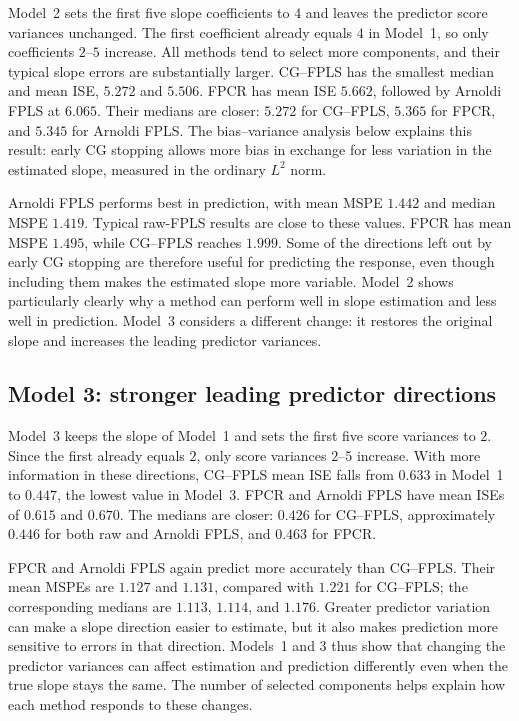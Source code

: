 Model~2 sets the first five slope coefficients to $4$ and leaves the predictor
score variances unchanged. The first coefficient already equals $4$ in
Model~1, so only coefficients $2$--$5$ increase. All methods tend to select
more components, and their typical slope errors are substantially larger. CG--FPLS
has the smallest median and mean ISE, $5.272$ and $5.506$. FPCR has mean
ISE $5.662$, followed by Arnoldi FPLS at $6.065$. Their medians are closer:
$5.272$ for CG--FPLS, $5.365$ for FPCR, and $5.345$ for Arnoldi FPLS. The
bias--variance analysis below explains this result: early CG stopping allows
more bias in exchange for less variation in the estimated slope, measured
in the ordinary $L^2$ norm.

Arnoldi FPLS performs best in prediction, with mean MSPE $1.442$ and median
MSPE $1.419$. Typical raw-FPLS results are close to these values. FPCR has
mean MSPE $1.495$, while CG--FPLS reaches $1.999$. Some of the directions
left out by early CG stopping are therefore useful for predicting the
response, even though including them makes the estimated slope more variable.
Model~2 shows particularly clearly why a method can perform well in slope
estimation and less well in prediction. Model~3 considers a different change:
it restores the original slope and increases the leading predictor variances.

\subsection{Model 3: stronger leading predictor directions}

Model~3 keeps the slope of Model~1 and sets the first five score variances
to $2$. Since the first already equals $2$, only score variances $2$--$5$
increase. With more information in these directions, CG--FPLS mean ISE falls
from $0.633$ in Model~1 to $0.447$, the lowest value in Model~3. FPCR and
Arnoldi FPLS have mean ISEs of $0.615$ and $0.670$. The medians are closer:
$0.426$ for CG--FPLS, approximately $0.446$ for both raw and Arnoldi FPLS,
and $0.463$ for FPCR.

FPCR and Arnoldi FPLS again predict more accurately than CG--FPLS. Their mean
MSPEs are $1.127$ and $1.131$, compared with $1.221$ for CG--FPLS; the
corresponding medians are $1.113$, $1.114$, and $1.176$. Greater predictor
variation can make a slope direction easier to estimate, but it also makes
prediction more sensitive to errors in that direction. Models~1 and 3 thus
show that changing the predictor variances can affect estimation and
prediction differently even when the true slope stays the same. The number
of selected components helps explain how each method responds to these
changes.

